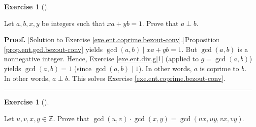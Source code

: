 \documentclass[numbers=enddot,12pt,final,onecolumn,notitlepage]{scrartcl}%
\newcounter{exer}
\numberwithin{exer}{subsection}
\theoremstyle{definition}
\newtheorem{exmp}[exer]{Exercise}
\newenvironment{exercise}[1][]
{\begin{exmp}[#1]\begin{leftbar}}
{\end{leftbar}\end{exmp}}
\newenvironment{fineprint}{\begin{small}}{\end{small}}
\newenvironment{proof}[1][Proof]{\noindent\textbf{#1.} }{\ \rule{0.5em}{0.5em}}
\begin{document}
\begin{exercise}
\label{exe.ent.coprime.bezout-conv} Let $a, b, x, y$ be integers such that $xa
+ yb = 1$. Prove that $a \perp b$.
\end{exercise}

\begin{fineprint}
\begin{proof}
[Solution to Exercise \ref{exe.ent.coprime.bezout-conv}.]Proposition
\ref{prop.ent.gcd.bezout-conv} yields $\gcd\left(  a,b\right)  \mid xa+yb=1$.
But $\gcd\left(  a,b\right)  $ is a nonnegative integer. Hence, Exercise
\ref{exe.ent.div.g|1} (applied to $g=\gcd\left(  a,b\right)  $) yields
$\gcd\left(  a,b\right)  =1$ (since $\gcd\left(  a,b\right)  \mid1$). In other
words, $a$ is coprime to $b$. In other words, $a\perp b$. This solves Exercise
\ref{exe.ent.coprime.bezout-conv}.
\end{proof}
\end{fineprint}

\begin{exercise}
\label{exe.ent.coprime.gcd*gcd1}Let $u,v,x,y\in\mathbb{Z}$. Prove that
$\gcd\left(  u,v\right)  \cdot\gcd\left(  x,y\right)  =\gcd\left(
ux,uy,vx,vy\right)  $.
\end{exercise}
\end{document}
